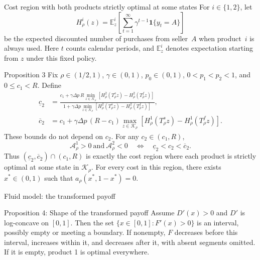 \documentclass[10pt]{beamer}
\begin{document}
\begin{frame}{\large Cost region with both products strictly optimal at some states}
    \footnotesize
    \setlength{\abovedisplayskip}{4pt}
    \setlength{\belowdisplayskip}{4pt}
    \setlength{\abovedisplayshortskip}{2pt}
    \setlength{\belowdisplayshortskip}{2pt}
    \setlength{\jot}{2pt}
    For $i\in\{1,2\}$, let
    \[
    H_\rho^i(z)
    =\mathbb E_z^i\left[\sum_{t=1}^{\infty}\gamma^{t-1}\mathbf 1\{y_t=A\}\right]
    \]
    be the expected discounted number of purchases from seller~$A$ when
    product~$i$ is always used. Here $t$ counts calendar periods, and
    $\mathbb E_z^i$ denotes expectation starting from $z$ under this fixed policy.

    \begin{block}{Proposition 3}
        Fix $\rho\in(1/2,1)$, $\gamma\in(0,1)$, $p_0\in(0,1)$,
        $0<p_1<p_2<1$, and $0\leq c_1<R$. Define
        \begin{align*}
        \underline c_2
        &=\frac{
         c_1+\gamma\Delta p\,R
         \displaystyle\min_{z\in\mathcal K_\rho}
         \left[H_\rho^2(T_\rho^s z)-H_\rho^2(T_\rho^f z)\right]
        }{
         1+\gamma\Delta p
         \displaystyle\min_{z\in\mathcal K_\rho}
         \left[H_\rho^2(T_\rho^s z)-H_\rho^2(T_\rho^f z)\right]
        },\\[1ex]
        \overline c_2
        &=c_1+\gamma\Delta p\,(R-c_1)
        \max_{z\in\mathcal K_\rho}
        \left[H_\rho^1(T_\rho^s z)-H_\rho^1(T_\rho^f z)\right].
        \end{align*}
        These bounds do not depend on $c_2$. For any $c_2\in(c_1,R)$,
        \begin{equation*}
        \mathcal A_\rho^1>0\ \text{and}\ \mathcal A_\rho^2<0
        \quad\Longleftrightarrow\quad
        \underline c_2<c_2<\overline c_2.
        \end{equation*}
        Thus $(\underline c_2,\overline c_2)\cap(c_1,R)$ is exactly the cost
        region where each product is strictly optimal at some state in
        $\mathcal K_\rho$. For every cost in this region, there exists
        $x^*\in(0,1)$ such that $a_\rho(x^*,1-x^*)=0$.
    \end{block}
\end{frame}

\begin{frame}{Fluid model: the transformed payoff}

    \begin{block}{Proposition 4: Shape of the transformed payoff}
        Assume $D'(x)>0$ and $D'$ is log-concave on $[0,1]$. Then the set $\{x\in[0,1]:F'(x)>0\}$ is an interval, possibly empty or meeting a boundary. If nonempty, $F$ decreases before this interval, increases within it, and decreases after it, with absent segments omitted.
        If it is empty, product 1 is optimal everywhere.
    \end{block}
\end{frame}
\end{document}
